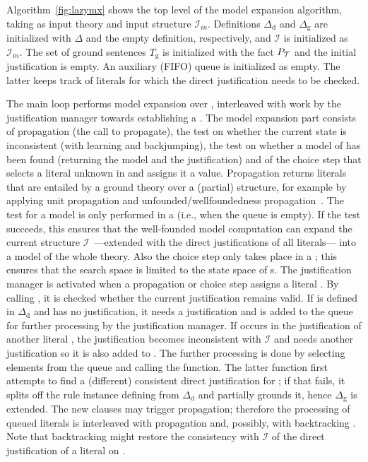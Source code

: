 \documentclass[11pt]{article}
\newcommand{\m}[1]{\ensuremath{#1}\xspace}
\newcommand{\I}{\m{\mathcal{I}}}
\newcommand{\Iin}{\m{\I_{in}}}
\newcommand{\theory}{\m{\mathcal{T}}}
\newcommand{\D}{\m{\Delta}}
\theoremstyle{plain}
\theoremstyle{definition}
\theoremstyle{example_basic}
\theoremstyle{example_contd}
\theoremstyle{plain}
\newcommand{\Dg}{\ensuremath{\D_\text{g}}\xspace}
\newcommand{\Dd}{\ensuremath{\D_\text{d}}\xspace}
\newcommand{\Sg}{\ensuremath{T_\text{g}}\xspace}
\newcommand{\pt}{\ensuremath{P_\text{\theory}}\xspace}
\newcommand{\change}[1]{#1}
\begin{document}
Algorithm~\ref{fig:lazymx} shows the top level of the \lazymx model expansion algorithm, taking as input theory  and input structure \Iin. Definitions \Dd and \Dg are initialized with \D and the empty definition, respectively, and \I is initialized as \Iin. The set of ground sentences \Sg is initialized with the fact \pt and the initial justification \jgraph is empty. An auxiliary (FIFO) queue \changes is initialized as empty. The latter keeps track of literals for which the direct justification needs to be checked. 

The main loop performs model expansion over , interleaved
with work by the justification manager towards establishing a
\dstate. The model expansion part consists of propagation (the call to
\textsf{propagate}), the test on whether the current state is
inconsistent (with learning and backjumping), the test on whether a
model of  has been found (returning the model and the
justification) and of the choice step that selects a literal unknown
in  and assigns it a value. \change{Propagation returns
  literals that are entailed by a ground theory over a (partial)
  structure, for example by applying unit propagation and
  unfounded/wellfoundedness propagation~\shortcite{sat/MarienWDB08}.}
The test for a model is only performed in a \dstate (i.e., when the
queue \changes is empty). If the test succeeds,  this ensures that the
well-founded model computation can expand the current structure
\I~---extended with the direct justifications of all literals--- into
a model of the whole theory. Also the choice step only takes place in
a \dstate; this ensures that the search space is limited to the state
space of {\dstate}s. 
\change{The justification manager is activated when a propagation or
  choice step assigns a literal . By calling \checkliteral, it is
  checked whether the current justification remains valid. If  is
  defined in \Dd and has no justification, it needs a justification
  and is added to the queue \changes for further processing by the
  justification manager. If  occurs in the justification of
  another literal , the justification becomes inconsistent with \I
  and  needs another justification so it is also added to
  \changes. The further processing is done by selecting elements from
  the queue and calling the \lazyground function. The latter function
  first attempts to find a (different) consistent direct justification
  for ; if that fails, it splits off the rule instance defining 
  from \Dd and partially grounds it, hence \Dg is extended. The new
  clauses may trigger propagation; therefore the
  processing of queued literals is interleaved with propagation
  and, possibly, with backtracking . Note
  that backtracking might restore the consistency with \I of the
  direct justification  of a literal  on \changes.  }
\end{document}
